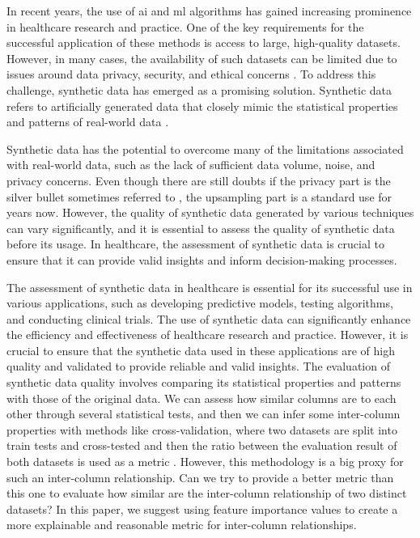
In recent years, the use of \ac{ai} and \ac{ml} algorithms has gained increasing prominence in healthcare research and practice. One of the key requirements for the successful application of these methods is access to large, high-quality datasets. However, in many cases, the availability of such datasets can be limited due to issues around data privacy, security, and ethical concerns \cite{chingOpportunitiesObstaclesDeep2018a}. To address this challenge, synthetic data has emerged as a promising solution. Synthetic data refers to artificially generated data that closely mimic the statistical properties and patterns of real-world data \cite{mullerEvaluationSyntheticElectronic2022}.

Synthetic data has the potential to overcome many of the limitations associated with real-world data, such as the lack of sufficient data volume, noise, and privacy concerns. Even though there are still doubts if the privacy part is the silver bullet sometimes referred to \cite{stadlerSyntheticDataPrivacy2020}, the upsampling part is a standard use for years now. However, the quality of synthetic data generated by various techniques can vary significantly, and it is essential to assess the quality of synthetic data before its usage. In healthcare, the assessment of synthetic data is crucial to ensure that it can provide valid insights and inform decision-making processes.

The assessment of synthetic data in healthcare is essential for its successful use in various applications, such as developing predictive models, testing algorithms, and conducting clinical trials. The use of synthetic data can significantly enhance the efficiency and effectiveness of healthcare research and practice. However, it is crucial to ensure that the synthetic data used in these applications are of high quality and validated to provide reliable and valid insights. The evaluation of synthetic data quality involves comparing its statistical properties and patterns with those of the original data. We can assess how similar columns are to each other through several statistical tests, and then we can infer some inter-column properties with methods like cross-validation, where two datasets are split into train tests and cross-tested and then the ratio between the evaluation result of both datasets is used as a metric \cite{mullerEvaluationSyntheticElectronic2022,goncalvesGenerationEvaluationSynthetic2020a}. However, this methodology is a big proxy for such an inter-column relationship. Can we try to provide a better metric than this one to evaluate how similar are the inter-column relationship of two distinct datasets? In this paper, we suggest using feature importance values to create a more explainable and reasonable metric for inter-column relationships.
